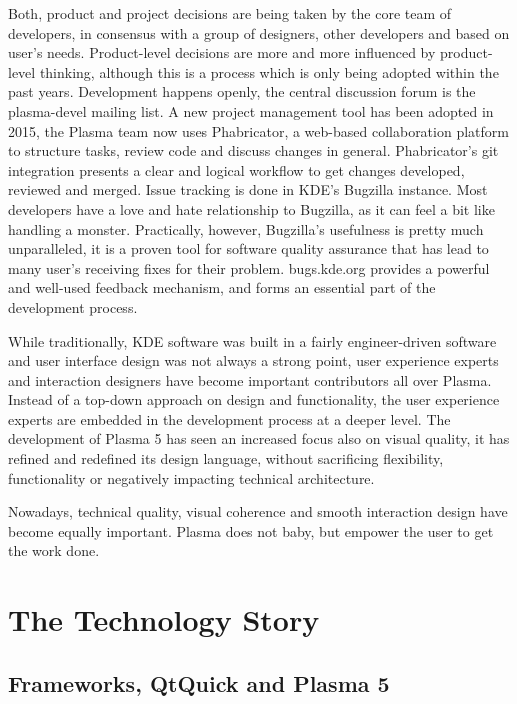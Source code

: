 Both, product and project decisions are being taken by the core team of developers, in consensus with a group of designers, other developers and based on user's needs. Product-level decisions are more and more influenced by product-level thinking, although this is a process which is only being adopted within the past years.
Development happens openly, the central discussion forum is the plasma-devel mailing list. A new project management tool has been adopted in 2015, the Plasma team now uses Phabricator, a web-based collaboration platform to structure tasks, review code and discuss changes in general. Phabricator's git integration presents a clear and logical workflow to get changes developed, reviewed and merged.
Issue tracking is done in KDE's Bugzilla instance. Most developers have a love and hate relationship to Bugzilla, as it can feel a bit like handling a monster. Practically, however, Bugzilla's usefulness is pretty much unparalleled, it is a proven tool for software quality assurance that has lead to many user's receiving fixes for their problem. bugs.kde.org provides a powerful and well-used feedback mechanism, and forms an essential part of the development process.

While traditionally, KDE software was built in a fairly engineer-driven software and user interface design was not always a strong point, user experience experts and interaction designers have become important contributors all over Plasma. Instead of a top-down approach on design and functionality, the user experience experts are embedded in the development process at a deeper level. The development of Plasma 5 has seen an increased focus also on visual quality, it has refined and redefined its design language, without sacrificing flexibility, functionality or negatively impacting technical architecture.

Nowadays, technical quality, visual coherence and smooth interaction design have become equally important. Plasma does not baby, but empower the user to get the work done.

\section*{The Technology Story}

\subsection*{Frameworks, QtQuick and Plasma 5}

